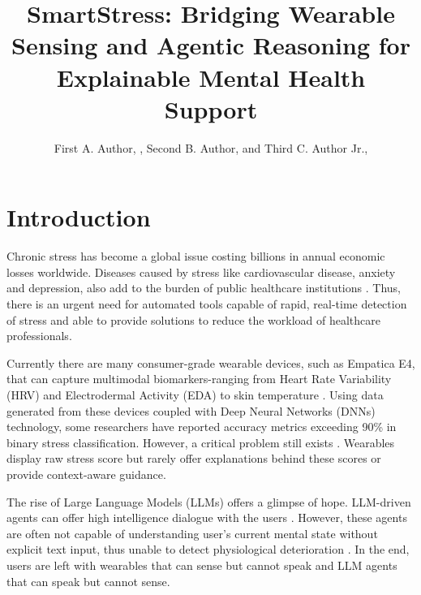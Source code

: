 \documentclass[journal,twoside,web]{ieeecolor}
\begin{document}
\title{SmartStress: Bridging Wearable Sensing and Agentic Reasoning for Explainable Mental Health Support}

\author{First A. Author, , Second B. Author, and Third C. Author Jr., 
}

\maketitle

\begin{abstract}

\end{abstract}

\begin{IEEEkeywords}

\end{IEEEkeywords}

\section{Introduction}
\label{sec:introduction}
Chronic stress has become a global issue costing billions in annual economic losses worldwide. Diseases caused by stress like cardiovascular disease, anxiety and depression, also add to the burden of public healthcare institutions \cite{gjoreski2016continuous} \cite{iqbal2022stress}. Thus, there is an urgent need for automated tools capable of rapid, real-time detection of stress and able to provide solutions to reduce the workload of healthcare professionals.

Currently there are many consumer-grade wearable devices, such as Empatica E4, that can capture multimodal biomarkers-ranging from Heart Rate Variability (HRV) and Electrodermal Activity (EDA) to skin temperature \cite{schmidt2018introducing}. Using data generated from these devices coupled with Deep Neural Networks (DNNs) technology, some researchers have reported accuracy metrics exceeding 90\% in binary stress classification. However, a critical problem still exists \cite{abd2024deep}. Wearables display raw stress score but rarely offer explanations behind these scores or provide context-aware guidance.

The rise of Large Language Models (LLMs) offers a glimpse of hope. LLM-driven agents can offer high intelligence dialogue with the users \cite{wang2024characteristic}. However, these agents are often not capable of understanding user’s current mental state without explicit text input, thus unable to detect physiological deterioration \cite{qiu2025emoagent}. In the end, users are left with wearables that can sense but cannot speak and LLM agents that can speak but cannot sense.
\end{document}
